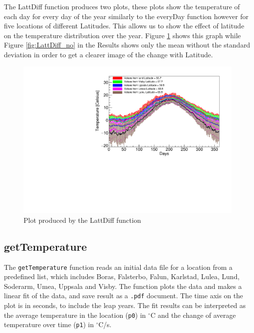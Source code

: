 \documentclass[a4paper,12pt]{article}
\begin{document}
The LattDiff function produces two plots, these plots show the temperature of each day for every day of the year similarly to the everyDay function however for five locations of different Latitudes. This allows us to  
show the effect of latitude on the temperature distribution over the year. Figure \ref{fig:LattDiff} shows this graph while Figure \ref{fig:LattDiff_no} in the Results shows only the mean without the standard deviation in order to get a clearer image of the change with Latitude.

\begin{figure}[h!]
    \centering
    \includegraphics[scale = 0.7]{every_day_graph_multiple_locations_standard_deviations_included.pdf}
    \caption{Plot produced by the LattDiff function}
    \label{fig:LattDiff}
\end{figure}







\subsection{getTemperature}

The \texttt{getTemperature} function reads an initial data file for a location from 
a predefined list, which includes Boras, Falsterbo, Falun, Karlstad, Lulea, Lund,
Soderarm, Umea, Uppsala and Visby. The function plots the data and makes a linear fit 
of the data, and save result as a \texttt{.pdf} document. The time axis on the plot
is in seconds, to include the leap years. The fit results can be interpreted as 
the average temperature in the location (\texttt{p0}) in $^\circ$C and the change of
average temperature over time (\texttt{p1}) in $^\circ$C/s. 
\end{document}
